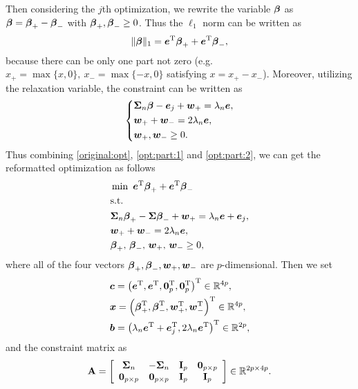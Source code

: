 Then considering the $j$th optimization, we rewrite the variable $\boldsymbol{\beta}$ as $\boldsymbol{\beta} = \boldsymbol{\beta}_{+} - \boldsymbol{\beta}_{-}$ with $\boldsymbol{\beta}_{+}, \boldsymbol{\beta}_{-} \geq 0$. Thus the $\ell_1$ norm can be written as
\begin{align}
    \|\boldsymbol{\beta}\|_1
    = \boldsymbol{e}^{\rm T}\boldsymbol{\beta}_{+} + \boldsymbol{e}^{\rm T}\boldsymbol{\beta}_{-}, \label{opt:part:1}
\end{align}
because there can be only one part not zero (e.g. $x_{+}=\max\{x,0\},~x_{-}=\max\{-x,0\}$ satisfying $x=x_{+}-x_{-}$). Moreover, utilizing the relaxation variable, the constraint can be written as
\begin{align}
    \left\{
    \begin{aligned}
         & \boldsymbol{\Sigma}_n\boldsymbol{\beta} - \boldsymbol{e}_j + \boldsymbol{w}_{+} = \lambda_n \boldsymbol{e},
        \\
         & \boldsymbol{w}_{+} + \boldsymbol{w}_{-} = 2\lambda_n\boldsymbol{e},
        \\
         & \boldsymbol{w}_{+}, \boldsymbol{w}_{-} \geq 0.
    \end{aligned}
    \right. \label{opt:part:2}
\end{align}
Thus combining \eqref{original:opt}, \eqref{opt:part:1} and \eqref{opt:part:2}, we can get the reformatted optimization as follows
\begin{equation}\label{opt:1}
    \begin{aligned}
         & \min~ \boldsymbol{e}^{\rm T}\boldsymbol{\beta}_{+} + \boldsymbol{e}^{\rm T}\boldsymbol{\beta}_{-}
        \\
         & \text{s.t.}
        \\
         & \begin{aligned}
             & \boldsymbol{\Sigma}_n\boldsymbol{\beta}_{+} - \boldsymbol{\Sigma}\boldsymbol{\beta}_{-} + \boldsymbol{w}_{+} = \lambda_n\boldsymbol{e} + \boldsymbol{e}_j,
            \\
             & \boldsymbol{w}_{+} + \boldsymbol{w}_{-} = 2\lambda_n \boldsymbol{e},
            \\
             & \boldsymbol{\beta}_{+}, \, \boldsymbol{\beta}_{-}, \, \boldsymbol{w}_{+}, \, \boldsymbol{w}_{-} \geq 0,
        \end{aligned}
    \end{aligned}
\end{equation}
where all of the four vectors $\boldsymbol{\beta}_{+},\boldsymbol{\beta}_{-},\boldsymbol{w}_{+},\boldsymbol{w}_{-}$ are $p$-dimensional. Then we set
\begin{align*}
     & \boldsymbol{c} = \left(\boldsymbol{e}^{\rm T}, \boldsymbol{e}^{\rm T}, \boldsymbol{0}_p^{\rm T}, \boldsymbol{0}_p^{\rm T}\right)^{\rm T}\in {\mathbb R}^{4p},
    \\
     & \boldsymbol{x} = \left(\boldsymbol{\beta}_{+}^{\rm T}, \boldsymbol{\beta}_{-}^{\rm T}, \boldsymbol{w}_{+}^{\rm T}, \boldsymbol{w}_{-}^{\rm T}\right)^{\rm T} \in {\mathbb R}^{4p},
    \\
     & \boldsymbol{b} = \left(\lambda_n\boldsymbol{e}^{\rm T}+\boldsymbol{e}_j^{\rm T}, 2\lambda_n \boldsymbol{e}^{\rm T}\right)^{\rm T} \in {\mathbb R}^{2p},
\end{align*}
and the constraint matrix as
\begin{align*}
    {\bf A} =
    \left[
        \begin{array}{cccc}
            \boldsymbol{\Sigma}_n      & -\boldsymbol{\Sigma}_n     & {\bf I}_p & \boldsymbol{0}_{p\times p} \\
            \boldsymbol{0}_{p\times p} & \boldsymbol{0}_{p\times p} & {\bf I}_p & {\bf I}_p
        \end{array}
        \right] \in {\mathbb R}^{2p\times 4p}.
\end{align*}

